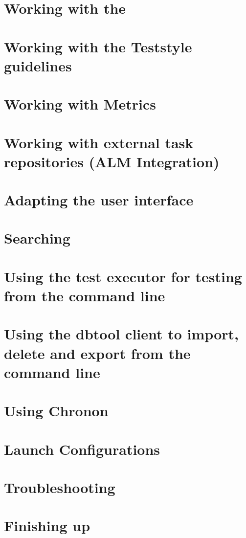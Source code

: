 \clearpage 

\section{Working with the \gdprobview}

\clearpage
\section{Working with the Teststyle guidelines}

\clearpage
\section{Working with Metrics}

\clearpage
\section{Working with external task repositories (ALM Integration)}
\label{TasksALM}



\clearpage

\section{Adapting the user interface}

\clearpage

\section{Searching}

\clearpage


\clearpage

\section{Using the test executor for testing from the command line}


\section{Using the dbtool client to import, delete and export from the command line}
\label{DBTool}



\section{Using Chronon}
\label{TasksChronon}
 

\section{Launch Configurations}
\label{LaunchConfigurations}


\clearpage

\section{Troubleshooting}


\clearpage

\section{Finishing up}

